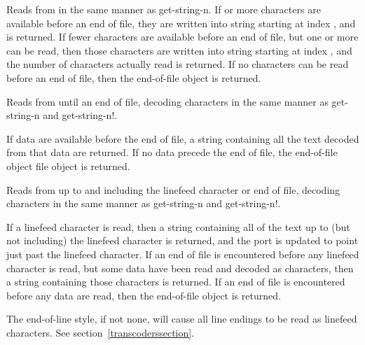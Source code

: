 \begin{entry}{%
}


Reads from  in the same manner as {\cf
  get-string-n}.  If  or more characters are available
before an end of file, they are written into string
starting at index , and  is returned. If fewer
characters are available before an end of file, but one
or more can be read, then those characters are written into string
starting at index , and the number of characters actually read is
returned. If no characters can be read before an end of file,
then the end-of-file object is returned.
\end{entry}   

\begin{entry}{%
}
   
Reads from  until an end of file, decoding
characters in the same manner as {\cf get-string-n} and {\cf get-string-n!}.
   
If data are available before the end of file, a string
containing all the text decoded from that data are returned. If no data
precede the end of file, the end-of-file object file object is
returned.
\end{entry}

\begin{entry}{%
}
   
Reads from  up to and including the linefeed
character or end of file, decoding characters in the same manner as
{\cf get-string-n} and {\cf get-string-n!}.
   
If a linefeed character is read, then a string
containing all of the text up to (but not including) the linefeed
character is returned, and the port is updated to point just past the
linefeed character. If an end of file is
encountered before any linefeed character is read, but some data
have been read and decoded as characters, then a string containing
those characters is returned. If an end of file is encountered before
any data are read, then the end-of-file object is
returned.

\begin{note}
  The end-of-line style, if not {\cf none}, will cause all line
  endings to be read as linefeed characters.  See
  section~\ref{transcoderssection}.
\end{note}
\end{entry}

